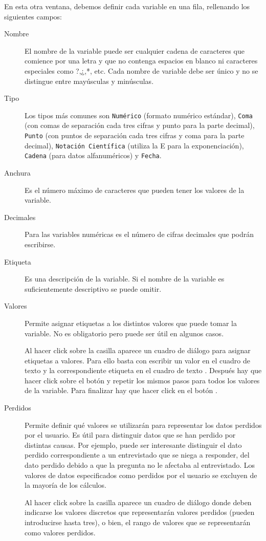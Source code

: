 En esta otra ventana, debemos definir cada variable en una fila, rellenando los siguientes campos:
\begin{description}
\item[Nombre] El nombre de la variable puede ser cualquier cadena de caracteres que comience por una letra y que no contenga espacios en blanco ni caracteres especiales como ?,¿,*, etc. Cada nombre de variable debe ser único y no se distingue entre mayúsculas y minúsculas. 
\item[Tipo] Los tipos más comunes son \texttt{Numérico} (formato numérico estándar), \texttt{Coma} (con comas de separación cada tres cifras y punto para la parte decimal), \texttt{Punto} (con puntos de separación cada tres cifras y coma para la parte decimal), \texttt{Notación Científica} (utiliza la E para la exponenciación), \texttt{Cadena} (para datos alfanuméricos) y \texttt{Fecha}.
\item[Anchura] Es el número máximo de caracteres que pueden tener los valores de la variable.
\item[Decimales] Para las variables numéricas es el número de cifras decimales que podrán escribirse.
\item[Etiqueta] Es una descripción de la variable. Si el nombre de la variable es suficientemente descriptivo se puede omitir. 
\item[Valores] Permite asignar etiquetas a los distintos valores que puede tomar la variable. No es obligatorio pero puede ser útil en algunos casos. 

Al hacer click sobre la casilla aparece un cuadro de diálogo para asignar etiquetas a valores. Para ello basta con escribir un valor en el cuadro de texto  y la correspondiente etiqueta en el cuadro de texto . Después hay que hacer click sobre el botón  y repetir los mismos pasos para todos los valores de la variable. Para finalizar hay que hacer click en el botón .
\item[Perdidos] Permite definir qué valores se utilizarán para representar los datos perdidos por el usuario. Es útil para distinguir datos que se han perdido por distintas causas. Por ejemplo, puede ser interesante distinguir el dato perdido correspondiente a un entrevistado que se niega a responder, del dato perdido debido a que la pregunta no le afectaba al entrevistado. Los valores de datos especificados como perdidos por el usuario se excluyen de la mayoría de los cálculos. 

Al hacer click sobre la casilla aparece un cuadro de diálogo donde deben indicarse los valores discretos que representarán valores perdidos (pueden introducirse hasta tres), o bien, el rango de valores que se representarán como valores perdidos. 


\end{description}
